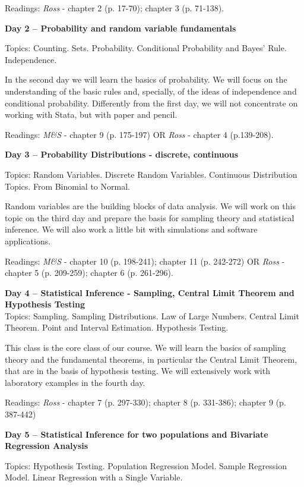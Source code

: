 \documentclass[a4paper,11pt]{article}
\begin{document}
Readings: \emph{Ross} - chapter 2 (p. 17-70); chapter 3 (p. 71-138).

\textbf{Day 2 -- Probability and random variable fundamentals}

Topics: Counting. Sets. Probability. Conditional Probability and Bayes' Rule. Independence.

In the second day we will learn the basics of probability. We will focus on the understanding of the basic rules and, specially, of the ideas of independence and conditional probability. Differently from the first day, we will not concentrate on working with Stata, but with paper and pencil.

Readings: \emph{M\&S} - chapter 9 (p. 175-197) OR \emph{Ross} - chapter 4 (p.139-208).

\textbf{Day 3 -- Probability Distributions - discrete, continuous}

Topics: Random Variables. Discrete Random Variables. Continuous Distribution Topics. From Binomial to Normal.

Random variables are the building blocks of data analysis. We will work on this topic on the third day and prepare the basis for sampling theory and statistical inference. We will also work a little bit with simulations and software applications.

Readings: \emph{M\&S} - chapter 10 (p. 198-241); chapter 11 (p. 242-272) OR \emph{Ross} - chapter 5 (p. 209-259); chapter 6 (p. 261-296).

\textbf{Day 4 -- Statistical Inference - Sampling, Central Limit Theorem and Hypothesis Testing}\\

Topics: Sampling. Sampling Distributions. Law of Large Numbers. Central Limit Theorem. Point and Interval Estimation. Hypothesis Testing.

This class is the core class of our course. We will learn the basics of sampling theory and the fundamental theorems, in particular the Central Limit Theorem, that are in the basis of hypothesis testing. We will extensively work with laboratory examples in the fourth day.

Readings: \emph{Ross} - chapter 7 (p. 297-330); chapter 8 (p. 331-386); chapter 9 (p. 387-442)

\textbf{Day 5 -- Statistical Inference for two populations and Bivariate Regression Analysis}

Topics: Hypothesis Testing. Population Regression Model. Sample Regression Model.  Linear Regression with a Single Variable.
\end{document}
